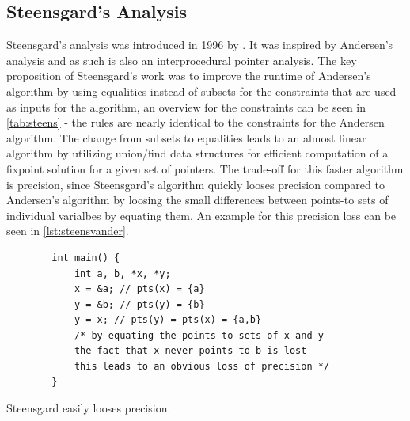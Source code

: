 \subsection{Steensgard's Analysis}
Steensgard's analysis was introduced in 1996 by \cite{steensgaard1996points}. It was inspired by Andersen's analysis and as such is also an interprocedural pointer analysis.
The key proposition of Steensgard's work was to improve the runtime of Andersen's algorithm by using equalities instead of subsets for the constraints that are used as inputs for the algorithm, an overview for the constraints can be seen in \autoref{tab:steens} - the rules are nearly identical to the constraints for the Andersen algorithm.
The change from subsets to equalities leads to an almost linear algorithm by utilizing union/find data structures for efficient computation of a fixpoint solution for a given set of pointers.
The trade-off for this faster algorithm is precision, since Steensgard's algorithm quickly looses precision compared to Andersen's algorithm by loosing the small differences between points-to sets of individual varialbes by equating them. An example for this precision loss can be seen in \autoref{lst:steensvander}.

\begin{listing}
    \begin{verbatim}
        int main() {
            int a, b, *x, *y;
            x = &a; // pts(x) = {a}
            y = &b; // pts(y) = {b}
            y = x; // pts(y) = pts(x) = {a,b}
            /* by equating the points-to sets of x and y
            the fact that x never points to b is lost
            this leads to an obvious loss of precision */
        }
    \end{verbatim}
    \caption{Steensgard easily looses precision.}
    \label{lst:steensvander}
\end{listing}

